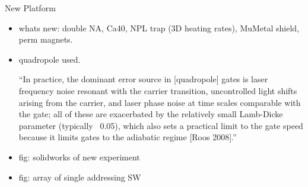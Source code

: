 \documentclass[final]{beamer}
\begin{document}
\begin{frame}{}
\begin{center}
\begin{columns}[T,onlytextwidth]
\begin{column}{0.48\textwidth}
    \begin{block}{New Platform}
      \begin{itemize}
      \item whats new: double NA, Ca40, NPL trap (3D heating rates), MuMetal shield, perm magnets.
      \item quadropole used.

        ``In practice, the dominant error source in [quadropole] gates is laser
        frequency noise resonant with the carrier transition,
        uncontrolled light shifts arising from the carrier, and laser
        phase noise at time scales comparable with the gate; all of
        these are exacerbated by the relatively small Lamb-Dicke
        parameter (typically ~0.05), which also sets a practical limit
        to the gate speed because it limits gates to the adiabatic
        regime [Roos 2008].''

      \item fig: solidworks of new experiment
      \item fig: array of single addressing SW
      \end{itemize}
    \end{block}

  \end{column}
\end{columns}
\end{center}

\end{frame}
\end{document}
